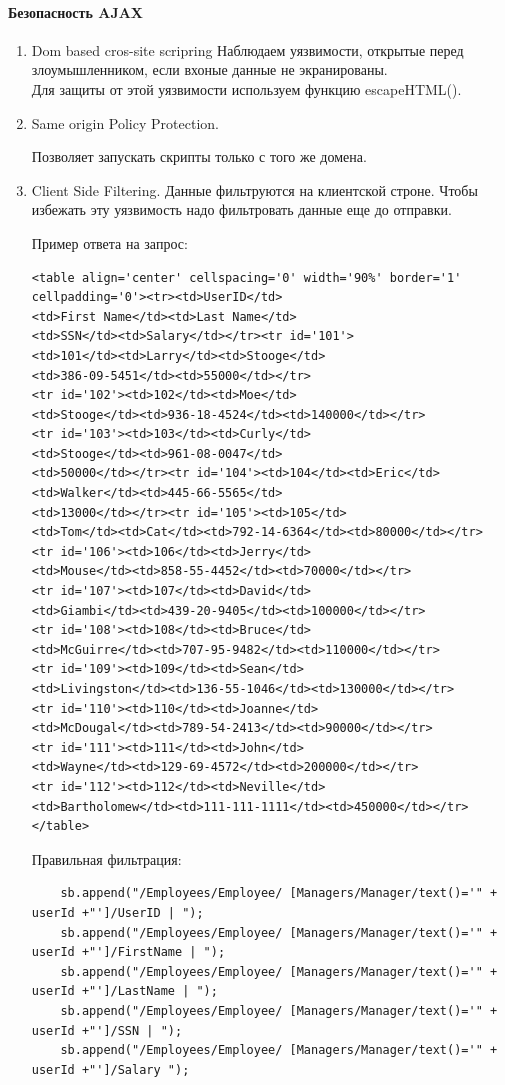\documentclass[10pt,a4paper]{article}
\begin{document}
\paragraph{Безопасность AJAX}
\begin{enumerate}
\item Dom based cros-site scripring
Наблюдаем уязвимости, открытые перед злоумышленником, если вхоные данные не экранированы.\\
Для защиты от этой уязвимости используем функцию escapeHTML().

\item Same origin Policy Protection. 

Позволяет запускать скрипты только с того же домена.

\item Client Side Filtering. 
Данные фильтруются на клиентской строне. Чтобы избежать эту уязвимость надо фильтровать данные еще до отправки.
 
Пример ответа на запрос:
\begin{verbatim}
<table align='center' cellspacing='0' width='90%' border='1' cellpadding='0'><tr><td>UserID</td>
<td>First Name</td><td>Last Name</td>
<td>SSN</td><td>Salary</td></tr><tr id='101'>
<td>101</td><td>Larry</td><td>Stooge</td>
<td>386-09-5451</td><td>55000</td></tr>
<tr id='102'><td>102</td><td>Moe</td>
<td>Stooge</td><td>936-18-4524</td><td>140000</td></tr>
<tr id='103'><td>103</td><td>Curly</td>
<td>Stooge</td><td>961-08-0047</td>
<td>50000</td></tr><tr id='104'><td>104</td><td>Eric</td>
<td>Walker</td><td>445-66-5565</td>
<td>13000</td></tr><tr id='105'><td>105</td>
<td>Tom</td><td>Cat</td><td>792-14-6364</td><td>80000</td></tr>
<tr id='106'><td>106</td><td>Jerry</td>
<td>Mouse</td><td>858-55-4452</td><td>70000</td></tr>
<tr id='107'><td>107</td><td>David</td>
<td>Giambi</td><td>439-20-9405</td><td>100000</td></tr>
<tr id='108'><td>108</td><td>Bruce</td>
<td>McGuirre</td><td>707-95-9482</td><td>110000</td></tr>
<tr id='109'><td>109</td><td>Sean</td>
<td>Livingston</td><td>136-55-1046</td><td>130000</td></tr>
<tr id='110'><td>110</td><td>Joanne</td>
<td>McDougal</td><td>789-54-2413</td><td>90000</td></tr>
<tr id='111'><td>111</td><td>John</td>
<td>Wayne</td><td>129-69-4572</td><td>200000</td></tr>
<tr id='112'><td>112</td><td>Neville</td>
<td>Bartholomew</td><td>111-111-1111</td><td>450000</td></tr></table>

\end{verbatim} 
 
Правильная фильтрация:
\begin{verbatim}
	sb.append("/Employees/Employee/ [Managers/Manager/text()='" + userId +"']/UserID | ");
	sb.append("/Employees/Employee/ [Managers/Manager/text()='" + userId +"']/FirstName | ");
	sb.append("/Employees/Employee/ [Managers/Manager/text()='" + userId +"']/LastName | ");
	sb.append("/Employees/Employee/ [Managers/Manager/text()='" + userId +"']/SSN | ");
	sb.append("/Employees/Employee/ [Managers/Manager/text()='" + userId +"']/Salary ");
\end{verbatim} 


\end{enumerate}
\end{document}
